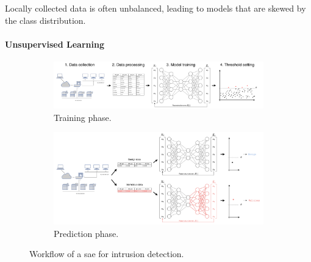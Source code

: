 \begin{challenge}
  Locally collected data is often unbalanced, leading to models that are skewed by the class distribution.
  \label{chall:bias}
\end{challenge}


\paragraph{Unsupervised Learning}

\begin{figure}
  \captionsetup{justification=justified,singlelinecheck=false}
  \centering
  \begin{subfigure}{\textwidth}
    \includegraphics[width=\textwidth]{figures/ae-train.drawio.pdf}
    \caption{
      Training phase.
      \label{fig:bg.ae.train}
    }
  \end{subfigure}
  \begin{subfigure}{\textwidth}
    \includegraphics[width=.75\textwidth,left]{figures/ae-predict.drawio.pdf}
    \caption{
      Prediction phase.
      \label{fig:bg.ae.predict}
    }
  \end{subfigure}
  \caption{
    Workflow of a \acrfull{sae} for intrusion detection.
    \label{fig:bg.ae}
  }
\end{figure}

